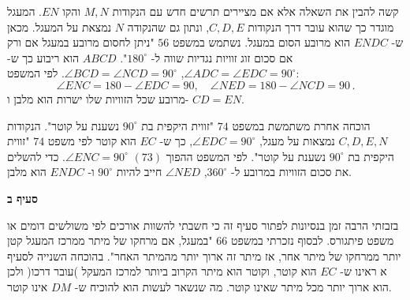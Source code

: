 קשה להבין את השאלה אלא אם מציירים תרשים חדש עם הנקודות 
$M,N$
והקו
$EN$.
המעגל מוגדר כך שהוא עובר דרך הנקודות
$C,D,E$,
ונתון גם שהנקודה
$N$
נמצאת על המעגל. מכאן ש-%
$ENDC$
הוא מרובע הסום במעגל. נשתמש במשפט 
$56$
"ניתן לחסום מרובע במעגל אם ורק אם סכום זוג זוויות נגדיות שווה ל-%
$180^\circ$".
$ABCD$
הוא ריבוע כך ש-%
$\angle ADC=\angle EDC=90^\circ$,
$\angle BCD=\angle NCD=90^\circ$.
לפי המשפט:
\[
\angle ENC=180-\angle EDC=90,\quad \angle NED=180-\angle NCD=90\,.
\]
מרובע שכל הזוויות שלו ישרות הוא מלבן ו-%
$CD=EN$.

\begin{center}
\end{center}

\np

הוכחה אחרת משתמשת במשפט
$74$
"זווית היקפית בת 
$90^\circ$
נשענת על קוטר". הנקודות
$C,D,E,N$
נמצאות על מעגל, 
$\angle EDC=90^\circ$,
כך ש-%
$EC$
הוא קוטר לפי משפט
$74$
"זווית היקפית בת
$90^\circ$
נשענת על קוטר". לפי המשפט ההפוך
$(73)$
$\angle ENC=90^\circ$.
כדי להשלים את סכום הזוויות במרובע ל-%
$360^\circ$,
$\angle NED$
חייב להיות 
$90^\circ$
ו-%
$ENDC$
הוא מלבן.


\textbf{סעיף ב}

בזבזתי הרבה זמן בנסיונות לפתור סעיף זה כי חשבתי להשוות אורכים לפי משולשים דומים או משפט פיתגורס. לבסוף נזכרתי במשפט
$66$
"במעגל, אם מרחקו של מיתר ממרכז המעגל קטן יותר ממרחקו של מיתר אחר, אז מיתר זה ארוך יותר מהמיתר האחר". בהוכחה השנייה לסעיף א ראינו ש-%
$EC$
הוא קוטר, וקוטר הוא מיתר הקרוב ביותר למרכז המעקל )עובר דרכו( ולכן הוא ארוך יותר מכל מיתר שאינו קוטר. מה שנשאר לעשות הוא להוכיח ש-%
$DM$
אינו קוטר.

